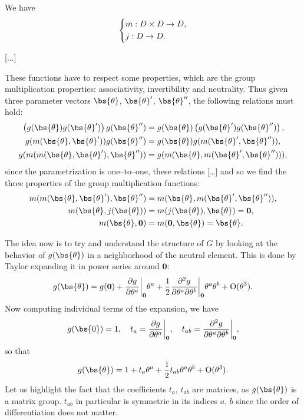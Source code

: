 We have
\[
    \begin{dcases}
        m : D \times D \to D, \\
        j : D \to D.
    \end{dcases}
\]

[...]

These functions have to respect some properties, which are the group multiplication properties: associativity, invertibility and neutrality. Thus given three parameter vectors \(\bs{\theta}\), \(\bs{\theta}'\), \(\bs{\theta}''\), the following relations must hold:
\[
    \begin{aligned}
        \left( g(\bs{\theta}) g(\bs{\theta}') \right) g(\bs{\theta}'') & = g(\bs{\theta}) \left( g(\bs{\theta}') g(\bs{\theta}'') \right), \\
        g(m(\bs{\theta}, \bs{\theta}')) g(\bs{\theta}'')               & = g(\bs{\theta})g(m(\bs{\theta}', \bs{\theta}'')),                \\
        g(m(m(\bs{\theta}, \bs{\theta}'), \bs{\theta}''))              & = g(m(\bs{\theta}, m(\bs{\theta}', \bs{\theta}''))),
    \end{aligned}
\]
since the parametrization is one–to–one, these relations
    [\dots ]
and so we find the three properties of the group multiplication functions:
\begin{equation}
    \begin{aligned}
        m(m(\bs{\theta}, \bs{\theta}'), \bs{\theta}'') & = m(\bs{\theta}, m(\bs{\theta}', \bs{\theta}'')), \\
        m(\bs{\theta}, j(\bs{\theta}))                 & = m(j(\bs{\theta}), \bs{\theta}) = \mathbf{0},    \\
        m(\bs{\theta}, \mathbf{0})                     & = m(\mathbf{0}, \bs{\theta}) = \bs{\theta}.
    \end{aligned}
\end{equation}

The idea now is to try and understand the structure of \(G\) by looking at the behavior of \(g(\bs{\theta})\) in a neighborhood of the neutral element. This is done by Taylor expanding it in power series around \(\mathbf{0}\):
\[
    g(\bs{\theta}) = g(\mathbf{0}) + \frac{\partial g}{\partial \theta^a} \bigg|_{\mathbf{0}} \theta^a + \frac{1}{2} \frac{\partial^2 g}{\partial \theta^a \partial \theta^b} \bigg|_{\mathbf{0}} \theta^a \theta^b + \mathrm{O}(\theta^3).
\]
Now computing individual terms of the expansion, we have
\[
    g(\bs{0}) = 1, \quad t_a = \frac{\partial g}{\partial \theta^a} \bigg|_{\mathbf{0}}, \quad t_{ab} = \frac{\partial^2 g}{\partial \theta^a \partial \theta^b} \bigg|_{\mathbf{0}},
\]
so that
\[
    g(\bs{\theta}) = 1 + t_a \theta^a + \frac{1}{2} t_{ab} \theta^a \theta^b + \mathrm{O}(\theta^3).
\]
Let us highlight the fact that the coefficients \(t_a\), \(t_{ab}\) are matrices, as \(g(\bs{\theta})\) is a matrix group. \(t_{ab}\) in particular is symmetric in its indices \(a\), \(b\) since the order of differentiation does not matter.

